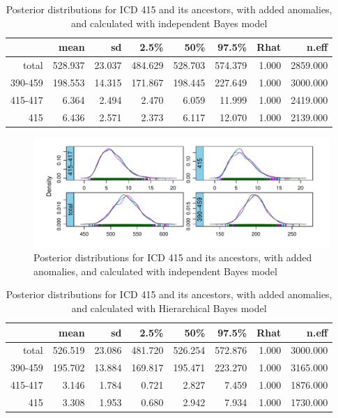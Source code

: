 \begin{table}[!t]
	\centering
	\begin{tabular}{rrrrrrrr}
		\hline
		& mean & sd & 2.5\% & 50\% & 97.5\% & Rhat & n.eff \\ 
		\hline
		total & 528.937 & 23.037 & 484.629 & 528.703 & 574.379 & 1.000 & 2859.000 \\ 
		390-459 & 198.553 & 14.315 & 171.867 & 198.445 & 227.649 & 1.000 & 3000.000 \\ 
		415-417 & 6.364 & 2.494 & 2.470 & 6.059 & 11.999 & 1.000 & 2419.000 \\ 
		415 & 6.436 & 2.571 & 2.373 & 6.117 & 12.070 & 1.000 & 2139.000 \\ 
		\hline
	\end{tabular}
	\caption{Posterior distributions for ICD 415 and its ancestors, with added anomalies, and calculated with independent Bayes model} 
	\label{tab:postsum415.mimic}
\end{table}

\begin{figure}[!h]
	\centering
	\includegraphics[width=1\linewidth]{../../R-codes/JAGS/plots/mimic/Density415}
	\caption{Posterior distributions for ICD 415 and its ancestors, with added anomalies, and calculated with independent Bayes model}
	\label{fig:density415}
\end{figure}

\newpage%

\begin{table}[!t]
	\centering
	\begin{tabular}{rrrrrrrr}
		\hline
		& mean & sd & 2.5\% & 50\% & 97.5\% & Rhat & n.eff \\ 
		\hline
		total & 526.519 & 23.086 & 481.720 & 526.254 & 572.876 & 1.000 & 3000.000 \\ 
		390-459 & 195.702 & 13.884 & 169.817 & 195.471 & 223.270 & 1.000 & 3165.000 \\ 
		415-417 & 3.146 & 1.784 & 0.721 & 2.827 & 7.459 & 1.000 & 1876.000 \\ 
		415 & 3.308 & 1.953 & 0.680 & 2.942 & 7.934 & 1.000 & 1730.000 \\ 
		\hline
	\end{tabular}
	\caption{Posterior distributions for ICD 415 and its ancestors, with added anomalies, and calculated with Hierarchical Bayes model} 
	\label{tab:postsum415h.mimic}
\end{table}

